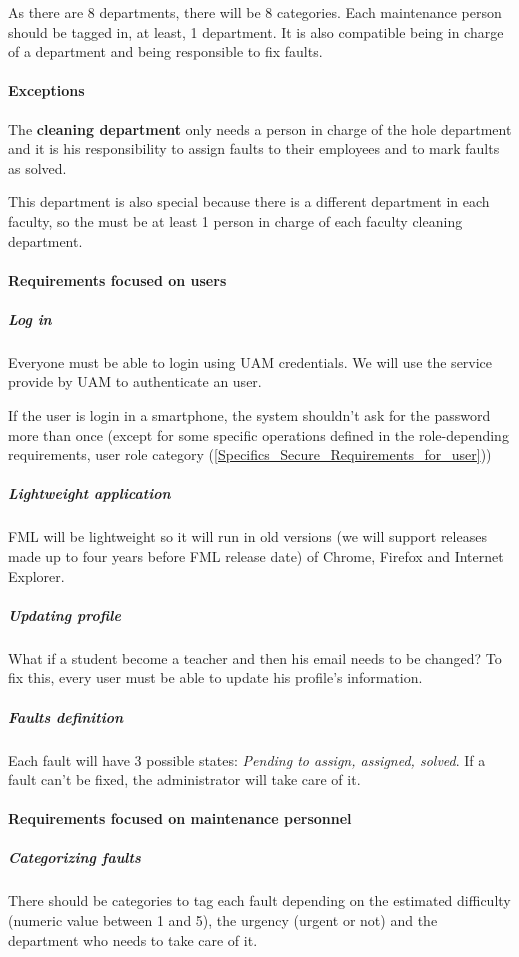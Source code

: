 \documentclass{report}
\begin{document}
As there are 8 departments, there will be 8 categories. Each maintenance person should be tagged in, at least, 1 department. It is also compatible being in charge of a department and being responsible to fix faults.

\paragraph{Exceptions} The \textbf{cleaning department} only needs a person in charge of the hole department and it is his responsibility to assign faults to their employees and to mark faults as solved.

This department is also special because there is a different department in each faculty, so the must be at least 1 person in charge of each faculty cleaning department.


\paragraph{Requirements focused on users}


\subparagraph{Log in} Everyone must be able to login using UAM credentials. We will use the service provide by UAM to authenticate an user.

If the user is login in a smartphone, the system shouldn't ask for the password more than once (except for some specific operations defined in the role-depending requirements, user role category (\ref{Specifics_Secure_Requirements_for_user}))

\subparagraph{Lightweight application}
FML will be lightweight so it will run in old versions (we will support releases made up to four years before FML release date) of Chrome, Firefox and Internet Explorer.

\subparagraph{Updating profile} What if a student become a teacher and then his email needs to be changed? To fix this, every user must be able to update his profile's information.

\subparagraph{Faults definition} Each fault will have 3 possible states: \textit{Pending to assign, assigned, solved}. If a fault can't be fixed, the administrator will take care of it.

\paragraph{Requirements focused on maintenance personnel}

\subparagraph{Categorizing faults} There should be categories to tag each fault depending on the estimated difficulty (numeric value between 1 and 5), the urgency (urgent or not) and the department who needs to take care of it.
\end{document}
